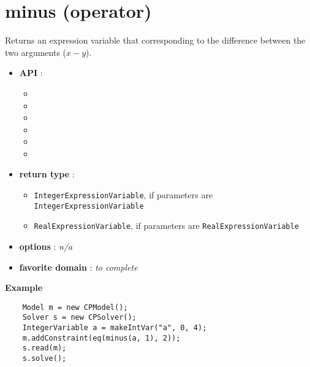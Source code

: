 \label{minus}
\hypertarget{minus}{}

\section{minus (operator)}\label{minus:minusoperator}\hypertarget{minus:minusoperator}{}
Returns an expression variable that corresponding to the difference between the two arguments (\(x-y\)).

\begin{itemize}
	\item \textbf{API} :
	\begin{itemize}
		\item {}
		\item {}
		\item {}
		\item {}
		\item {}
		\item {}
	\end{itemize}
	\item \textbf{return type} :
	\begin{itemize}
		\item \texttt{IntegerExpressionVariable}, if parameters are \texttt{IntegerExpressionVariable}
		\item \texttt{RealExpressionVariable}, if parameters are \texttt{RealExpressionVariable}
	\end{itemize}
	\item \textbf{options} : \emph{n/a}
	\item \textbf{favorite domain} : \emph{to complete}
\end{itemize}

\textbf{Example}
\begin{lstlisting}
	Model m = new CPModel();
	Solver s = new CPSolver();
	IntegerVariable a = makeIntVar("a", 0, 4);
	m.addConstraint(eq(minus(a, 1), 2));
	s.read(m);
	s.solve();
\end{lstlisting}
